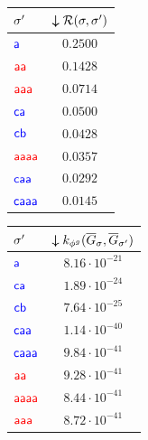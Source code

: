 {{\begin{table}[!t]
{\begin{tabular}{l|c}
	{${\sigma'}$} &
	{$\boldsymbol{\downarrow}\mathcal{R}(\sigma,{\sigma'})$} \\
	
	
	\midrule
	$\mathsf{\color{blue}a}$  &  $0.2500$ \\
	$\mathsf{\color{red}aa}$  &  $0.1428$  \\
	$\mathsf{\color{red}aaa}$  & $0.0714$ \\
	$\mathsf{\color{blue}ca}$  &   $0.0500$\\
	$\mathsf{\color{blue}cb}$  & $0.0428$ \\
	$\mathsf{\color{red}aaaa}$  &  $0.0357$ \\
	$\mathsf{\color{blue}caa}$  &  $0.0292$ \\
	$\mathsf{\color{blue}caaa}$  &   $0.0145$ \\
	\bottomrule
\end{tabular}\quad	\begin{tabular}{l|c}
	\toprule
	
	{${\sigma'}$} &
	{$\boldsymbol{\downarrow}k_{{\phi^{g}}}(\overline{G}_\sigma,\overline{G}_{{\sigma'}})$} \\

	
	\midrule
	$\mathsf{\color{blue}a}$  & $8.16\cdot 10^{-21}$ \\
	$\mathsf{\color{blue}ca}$  &   $1.89\cdot 10^{-24}$\\
	$\mathsf{\color{blue}cb}$  &   $7.64\cdot 10^{-25}$\\
	$\mathsf{\color{blue}caa}$  &$1.14\cdot 10^{-40}$\\
	$\mathsf{\color{blue}caaa}$  &  $9.84\cdot 10^{-41}$\\
	$\mathsf{\color{red}aa}$  &  $9.28\cdot 10^{-41}$ \\
	$\mathsf{\color{red}aaaa}$  & $8.44\cdot 10^{-41}$\\
	$\mathsf{\color{red}aaa}$  &  $8.72\cdot 10^{-41}$\\
	\bottomrule
\end{tabular}}
\end{table}




}}

